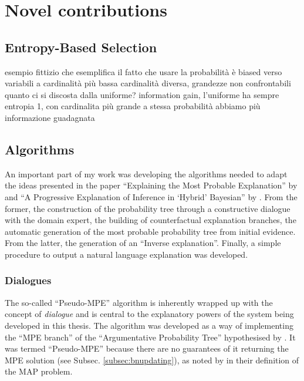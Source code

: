 \section{Novel contributions}\label{sec:novel-contributions}


\subsection{Entropy-Based Selection} \label{subsec:entropy-based-selection}

esempio fittizio che esemplifica il fatto che usare la probabilità è biased verso variabili a cardinalità più bassa
cardinalità diversa, grandezze non confrontabili
quanto ci si discosta dalla uniforme?  information gain, l'uniforme ha sempre entropia 1, con  cardinalita più grande a stessa probabilità abbiamo più informazione guadagnata

\subsection{Algorithms} \label{subsec:algorithms-novel}
An important part of my work was developing the algorithms needed to adapt the ideas presented in the paper \enquote{Explaining the Most Probable Explanation} by \cite{Butz2018} and \enquote{A Progressive Explanation of Inference in \enquote{Hybrid} Bayesian} by \cite{Kyrimi2016}.
From the former, the construction of the probability tree through a constructive dialogue with the domain expert, the building of counterfactual explanation branches, the automatic generation of the most probable probability tree from initial evidence.
From the latter, the generation of an \enquote{Inverse explanation}.
Finally, a simple procedure to output a natural language explanation was developed.

\subsubsection{Dialogues} \label{subsubsec:dialogues}
The so-called \enquote{Pseudo-MPE} algorithm is inherently wrapped up with the concept of \textit{dialogue} and is central to the explanatory powers of the system being developed in this thesis.
The algorithm was developed as a way of implementing the \enquote{MPE branch} of the \enquote{Argumentative Probability Tree} hypothesised by \cite{Butz2018}.
It was termed \enquote{Pseudo-MPE} because there are no guarantees of it returning the MPE solution (see Subsec. \ref{subsec:bnupdating}), as noted by \cite{koller2007introduction} in their definition of the MAP problem.

